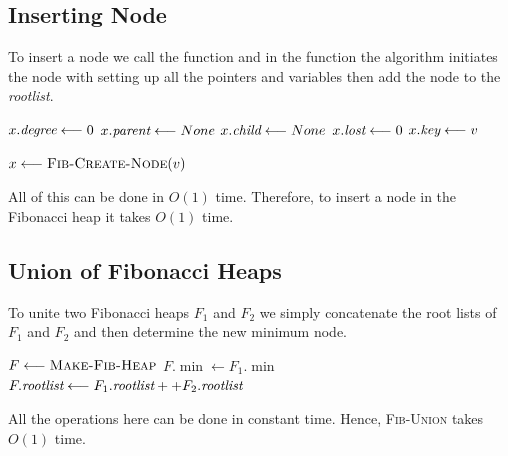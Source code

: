 \subsection{Inserting Node}
To insert a node we call the  function and in the function the algorithm initiates the node with setting up all the pointers and variables then add the node to the \emph{rootlist}.\parinf

\begin{minipage}{0.45\textwidth}
	\begin{algorithm}[H]
		\DontPrintSemicolon
		\caption{\textsc{Fib-Create-Node}$(v)$}
		$x.\emph{degree}\longleftarrow 0$\;
		$x.\emph{parent}\longleftarrow None$\;
		$x.\emph{child}\longleftarrow None$\;
		$x.\emph{lost}\longleftarrow 0$\;
		$x.\emph{key}\longleftarrow v$\;
	\end{algorithm}
\end{minipage}\hfill
\begin{minipage}{0.45\textwidth}
	\begin{algorithm}[H]
		\DontPrintSemicolon
		\caption{\textsc{Fib-Insert}$(F,v)$}
		$x\longleftarrow \textsc{Fib-Create-Node}(v)$\;
	\end{algorithm}
\end{minipage}

All of this can be done in $O(1)$ time. Therefore, to insert a node in the Fibonacci heap it takes $O(1)$ time.
\subsection{Union of Fibonacci Heaps}
To unite two Fibonacci heaps $F_1$ and $F_2$ we simply concatenate the root lists of $F_1$ and $F_2$ and then determine the new minimum node.
\begin{algorithm}
	\DontPrintSemicolon
	\caption{\textsc{Fib-Union}$(F_1,F_2)$}
	$F\longleftarrow \textsc{Make-Fib-Heap}$\;
	$F.\min\longleftarrow F_1.\min$\;
	$F.\emph{rootlist}\longleftarrow F_1.\emph{rootlist} ++ F_2.\emph{rootlist}$\;
\end{algorithm}
All the operations here can be done in constant time. Hence, \textsc{Fib-Union} takes $O(1)$ time.
